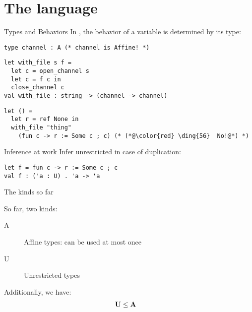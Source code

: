 \documentclass[xcolor=svgnames,11pt]{beamer}
\begin{document}
\section{The \lang language}

\begin{frame}[fragile]{Types and Behaviors}
  In \lang, the behavior of a variable is determined
  by its type:
\begin{lstlisting}
type channel : A (* channel is Affine! *)
\end{lstlisting}\pause
\begin{lstlisting}
let with_file s f = 
  let c = open_channel s
  let c = f c in
  close_channel c
val with_file : string -> (channel -> channel)
\end{lstlisting}\pause
\begin{lstlisting}
let () = 
  let r = ref None in
  with_file "thing"
    (fun c -> r := Some c ; c) (* (*@\color{red} \ding{56}  No!@*) *)
\end{lstlisting}
\end{frame}

\begin{frame}[fragile]{Inference at work}
  Infer unrestricted in case of duplication:
\begin{lstlisting}
let f = fun c -> r := Some c ; c
val f : ('a : U) . 'a -> 'a
\end{lstlisting}
\end{frame}

\begin{frame}{The kinds so far}

  So far, two kinds:
  \begin{description}
  \item[A] Affine types: can be used at most once
  \item[U] Unrestricted types
  \end{description}

  Additionally, we have:
  \begin{align*}
    \mathbf{U} &\leq \mathbf{A}
  \end{align*}
\end{frame}

\end{document}
